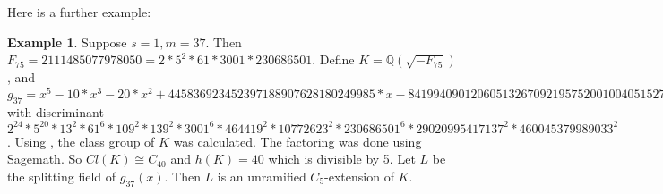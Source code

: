 \documentclass[12pt]{extarticle}
\newcommand{\Q}{\mathbb{Q}}
\newcommand{\<}{\langle}
\renewcommand{\>}{\rangle}
\theoremstyle{definition}
\newtheorem*{example}{Example}
\begin{document}
Here is a further example:
\begin{example}
Suppose $s=1, m= 37$. Then $F_{75} = 2111485077978050 = 2 * 5^2 * 61 * 3001 * 230686501$. Define $K = \Q(\sqrt{-F_{75}})$, and $g_{37} = x^5 - 10*x^3 - 20*x^2 + 445836923452397188907628180249985*x - 841994090120605132670921957520010040515272300004
$ with discriminant $2^{24} * 5^{20} * 13^2 * 61^6 * 109^2 * 139^2 * 3001^6 * 464419^2 * 10772623^2 * 230686501^6 * 29020995417137^2 * 460045379989033^2$. Using \href{http://magma.maths.usyd.edu.au/calc/}, the class group of $K$ was calculated. The factoring was done using Sagemath. So $Cl(K) \cong C_{40} $ and $h(K) = 40$ which is divisible by 5. Let $L$ be the splitting field of $g_{37}(x)$. Then $L$ is an unramified $C_5$-extension of $K$. 
\end{example}
\end{document}
